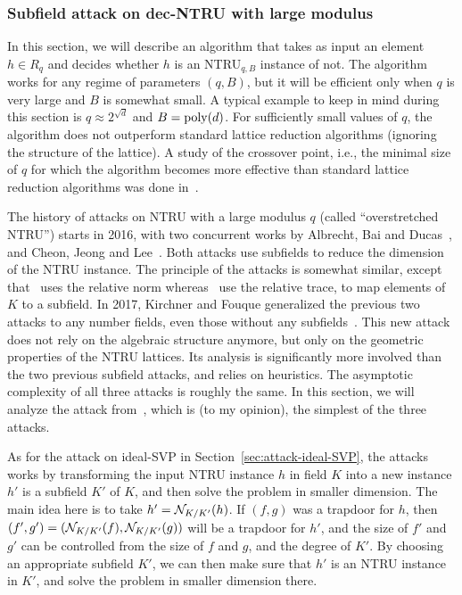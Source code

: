 \subsubsection{Subfield attack on dec-NTRU with large modulus}
\label{sec:attack-NTRU}

In this section, we will describe an algorithm that takes as input an element $h \in R_q$ and decides whether $h$ is an NTRU$_{q,B}$ instance of not. The algorithm works for any regime of parameters $(q,B)$, but it will be efficient only when $q$ is very large and $B$ is somewhat small. A typical example to keep in mind during this section is $q \approx 2^{\sqrt{d}}$ and $B = \operatorname{poly}(d)$. For sufficiently small values of $q$, the algorithm does not outperform standard lattice reduction algorithms (ignoring the structure of the lattice). A study of the crossover point, i.e., the minimal size of $q$ for which the algorithm becomes more effective than standard lattice reduction algorithms was done in~\cite{DW21}.

The history of attacks on NTRU with a large modulus $q$ (called ``overstretched NTRU'') starts in 2016, with two concurrent works by Albrecht, Bai and Ducas~\cite{ABD16}, and Cheon, Jeong and Lee~\cite{CJL16}. Both attacks use subfields to reduce the dimension of the NTRU instance. The principle of the attacks is somewhat similar, except that~\cite{ABD16} uses the relative norm whereas~\cite{CJL16} use the relative trace, to map elements of $K$ to a subfield.
In 2017, Kirchner and Fouque generalized the previous two attacks to any number fields, even those without any subfields~\cite{KF17}. This new attack does not rely on the algebraic structure anymore, but only on the geometric properties of the NTRU lattices. Its analysis is significantly more involved than the two previous subfield attacks, and relies on heuristics. The asymptotic complexity of all three attacks is roughly the same.
In this section, we will analyze the attack from~\cite{ABD16}, which is (to my opinion), the simplest of the three attacks.

As for the attack on ideal-SVP in Section~\ref{sec:attack-ideal-SVP}, the attacks works by transforming the input NTRU instance $h$ in field $K$ into a new instance $h'$ is a subfield $K'$ of $K$, and then solve the problem in smaller dimension. The main idea here is to take $h' = \mathcal{N}_{K/K'}(h)$. If $(f,g)$ was a trapdoor for $h$, then $(f', g') = (\mathcal{N}_{K/K'}(f),\mathcal{N}_{K/K'}(g))$ will be a trapdoor for $h'$, and the size of $f'$ and $g'$ can be controlled from the size of $f$ and $g$, and the degree of $K'$. By choosing an appropriate subfield $K'$, we can then make sure that $h'$ is an NTRU instance in $K'$, and solve the problem in smaller dimension there.

